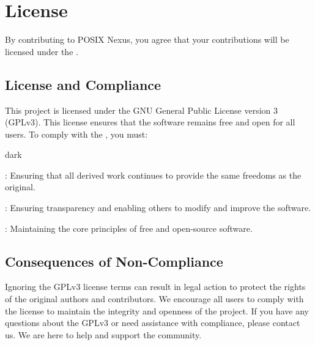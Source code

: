 \section{License}
\label{sec:license}
By contributing to POSIX Nexus, you agree that your contributions will be licensed under the .

\subsection{License and Compliance}
\label{sec:license:sub:compliance}
This project is licensed under the GNU General Public License version 3 (GPLv3).
This license ensures that the software remains free and open for all users.
To comply with the , you must:
\bigskip
\begin{baseBoxOne}{}{dark}
    \begin{posnexItemize}
        \item[\sA] : Ensuring that all derived work continues to provide the same freedoms as the original.
        \item[\sA] : Ensuring transparency and enabling others to modify and improve the software.
        \item[\sA] : Maintaining the core principles of free and open-source software.
    \end{posnexItemize}
\end{baseBoxOne}

\subsection{Consequences of Non-Compliance}
\label{sec:license:sub:consequence}
Ignoring the GPLv3 license terms can result in legal action to protect the rights of the original authors and contributors. We encourage all users to comply with the license to maintain the integrity and openness of the project. If you have any questions about the GPLv3 or need assistance with compliance, please contact us. We are here to help and support the community.

